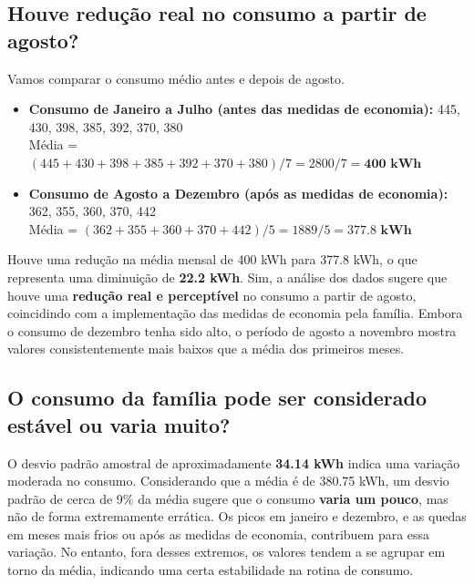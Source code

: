 \documentclass{article}
\begin{document}
\subsection*{Houve redução real no consumo a partir de agosto?}
Vamos comparar o consumo médio antes e depois de agosto.
\begin{itemize}
    \item \textbf{Consumo de Janeiro a Julho (antes das medidas de economia):}
    445, 430, 398, 385, 392, 370, 380 \\
    Média = $(445 + 430 + 398 + 385 + 392 + 370 + 380) / 7 = 2800 / 7 = \mathbf{400 \text{ kWh}}$

    \item \textbf{Consumo de Agosto a Dezembro (após as medidas de economia):}
    362, 355, 360, 370, 442 \\
    Média = $(362 + 355 + 360 + 370 + 442) / 5 = 1889 / 5 = \mathbf{377.8 \text{ kWh}}$
\end{itemize}
Houve uma redução na média mensal de 400 kWh para 377.8 kWh, o que representa uma diminuição de \textbf{22.2 kWh}. Sim, a análise dos dados sugere que houve uma \textbf{redução real e perceptível} no consumo a partir de agosto, coincidindo com a implementação das medidas de economia pela família. Embora o consumo de dezembro tenha sido alto, o período de agosto a novembro mostra valores consistentemente mais baixos que a média dos primeiros meses.

\subsection*{O consumo da família pode ser considerado estável ou varia muito?}
O desvio padrão amostral de aproximadamente \textbf{34.14 kWh} indica uma variação moderada no consumo. Considerando que a média é de 380.75 kWh, um desvio padrão de cerca de 9\% da média sugere que o consumo \textbf{varia um pouco}, mas não de forma extremamente errática. Os picos em janeiro e dezembro, e as quedas em meses mais frios ou após as medidas de economia, contribuem para essa variação. No entanto, fora desses extremos, os valores tendem a se agrupar em torno da média, indicando uma certa estabilidade na rotina de consumo.
\end{document}
